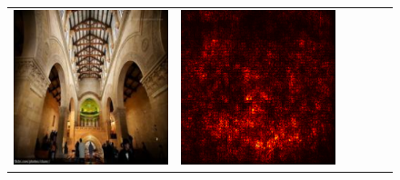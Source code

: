 \documentclass[preprint,12pt]{elsarticle}
\begin{document}
\begin{figure}[p]
\begin{tabular}{cccccc}
  \includegraphics[scale=\scale]{../visualizations/examples/imagenette/resnet18/images/6.png} &
  \includegraphics[scale=\scale]{../visualizations/examples/imagenette/resnet18/saliency_map/6.png} & 

\end{tabular}
\end{figure}
\end{document}
